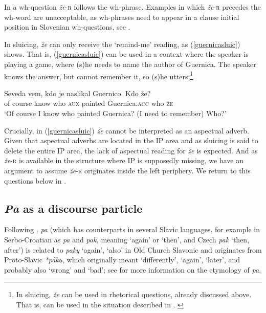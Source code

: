 \documentclass[output=paper,
modfonts,
newtxmath,
hidelinks
]{langscibook}
\begin{document}
\noindent In a wh-question \textit{že}-\textsc{r} follows the wh-phrase. Examples in which \textit{že}-\textsc{r} precedes the wh-word are unacceptable, as wh-phrases need to appear in a clause initial position in Slovenian wh-questions, see \cite{mismas2016benj}. 

\z

\noindent In sluicing, \textit{že} can only receive the `remind-me' reading, as (\ref{guernicasluic}) shows. That is, (\ref{guernicasluic}) can be used in a context where the speaker is playing a game, where (s)he needs to name the author of Guernica. The speaker knows the answer, but cannot remember it, so (s)he utters:\footnote{In sluicing, \textit{že} can be used in rhetorical questions, already discussed above. That is,  can be used in the situation described in .
\label{zakajzefn}
\zlast}

\ea \label{guernicasluic}
\gll  Seveda vem, kdo je naslikal Guernico. Kdo že?\\
{of course} know who \textsc{aux} painted Guernica.\textsc{acc} who \textsc{že}\\
\glt `Of course I know who painted Guernica? (I need to remember) Who?'
\z

\noindent Crucially, in (\ref{guernicasluic}) \textit{že} cannot be interpreted as an aspectual adverb. Given that aspectual adverbs are located in the IP area and as sluicing is said to delete the entire IP area, the lack of aspectual reading for \textit{že} is expected. And as \textit{že}-\textsc{r} is available in the structure where IP is supposedly missing, we have an argument to assume \textit{že}-\textsc{r} originates inside the left periphery. We return to this questions below in . 


\subsection{\textit{Pa} as a discourse particle}

Following \cite{snoj2009}, \textit{pa} (which has counterparts in several Slavic languages, for example in Serbo-Croatian as \textit{pa} and \textit{pak,} meaning `again' or `then', and Czech \textit{pak} `then, after') is related to \textit{paky} `again', `also' in Old Church Slavonic and originates from Proto-Slavic \textit{*pȃkъ}, which originally meant `differently', `again', `later', and probably also `wrong' and `bad'; see \cite{snoj2009} for more information on the etymology of \textit{pa}.
\end{document}
